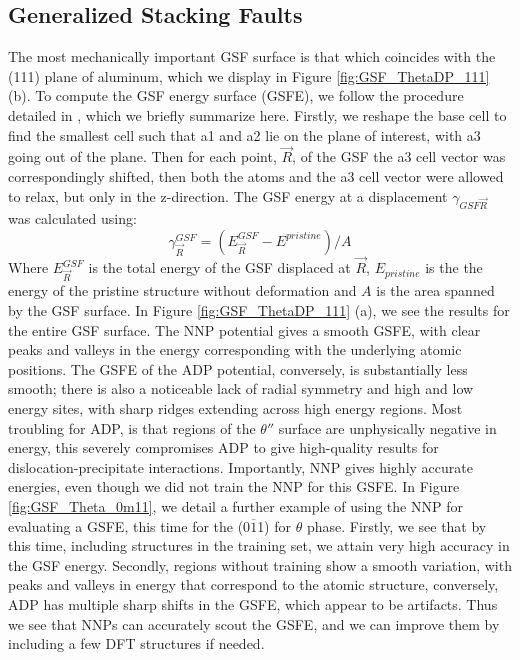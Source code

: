 \documentclass{article}
\begin{document}
\subsection{Generalized Stacking Faults}
The most mechanically important GSF surface is that which coincides with the (111) plane of aluminum, which we display in Figure \ref{fig:GSF_ThetaDP_111} (b).
To compute the GSF energy surface (GSFE), we follow the procedure detailed in \cite{Yin2017a}, which we briefly summarize here.
Firstly, we reshape the base cell to find the smallest cell such that a1 and a2 lie on the plane of interest, with a3 going out of the plane.
Then for each point, $\vec{R}$, of the GSF the a3  cell vector was correspondingly shifted,
then both the atoms and the a3 cell vector were allowed to relax, but only in the z-direction.
The GSF energy at a displacement $\gamma_{GSF\vec{R}}$ was calculated using: 
\begin{equation}
\gamma^{GSF}_{\vec{R}} = (E^{GSF}_{\vec{R}} - E^{pristine})/A
\end{equation}
Where $E^{GSF}_{\vec{R}}$ is the total energy of the GSF displaced at $\vec{R}$, $E_{pristine}$ is the 
the energy of the pristine structure without deformation and $A$ is the area spanned by the GSF surface.
In Figure \ref{fig:GSF_ThetaDP_111} (a), we see the results for the entire GSF surface.
The NNP potential gives a smooth GSFE, with clear peaks and valleys in the energy corresponding with the underlying atomic positions.
The GSFE of the ADP potential, conversely, is substantially less smooth; there is also a noticeable lack of radial symmetry and high and low energy sites,  with sharp ridges extending across high energy regions.
Most troubling for ADP, is that regions of the $\theta''$ surface are unphysically negative in energy, this severely compromises ADP to give high-quality results for dislocation-precipitate interactions.
Importantly, NNP gives highly accurate energies, even though we did not train the NNP for this GSFE.
In Figure \ref{fig:GSF_Theta_0m11}, we detail a further example of using the NNP for evaluating a GSFE, this time for the (0$\overline{1}$1) for $\theta$ phase. 
Firstly, we see that by this time, including structures in the training set, we attain very high accuracy in the GSF energy. 
Secondly, regions without training show a smooth variation, with peaks and valleys in energy that correspond to the atomic structure, conversely, ADP has multiple sharp shifts in the GSFE, which appear to be artifacts.  Thus we see that NNPs can accurately scout the GSFE, and we can improve them by including a few DFT structures if needed. 
\end{document}
